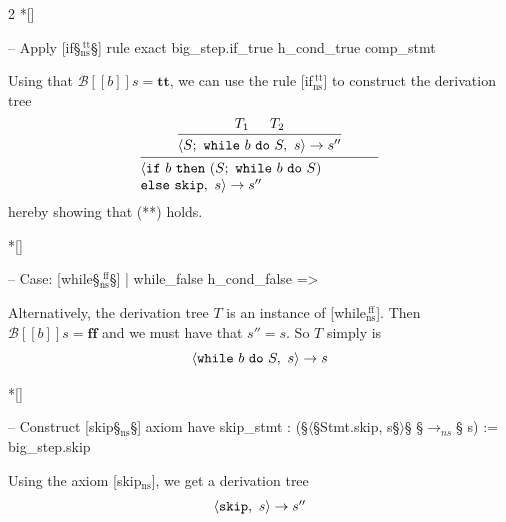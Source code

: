 \begin{paracol}{2}
\switchcolumn[1]*[]
\begin{leftcolumn}
    \begin{Lean_Code}
    -- Apply [if§\color{green!40!black}$_{\text{ns}}^{\ \text{tt}}$§] rule
    exact big_step.if_true
      h_cond_true
      comp_stmt
    \end{Lean_Code}
\end{leftcolumn}

\begin{rightcolumn} \noindent
Using that \(\mathcal{B}[\![b]\!]s = \mathbf{tt}\), we can use the rule [if$_{\text{ns}}^{\ \text{tt}}$]
to construct the derivation tree
\[
    \begin{prooftree}
        \hypo{T_1}
        \hypo{T_2}
        \infer[
            ]2{
            \langle S;\ \mathtt{while}\ b\ \mathtt{do}\ S,\ s\rangle \to s''
            }
        \infer[
            ]1{
                \parbox{6cm}{$
            \langle \mathtt{if}\ b\ \mathtt{then}\ (S;\ \mathtt{while}\ b\ \mathtt{do}\ S) \\ \mathtt{else}\ \mathtt{skip},\ s\rangle \to s''
                $}
            }
    \end{prooftree}
\]
hereby showing that (**) holds.
\end{rightcolumn}
\vspace{2em}
\switchcolumn[1]*[]
\begin{leftcolumn}
    \begin{Lean_Code}
  -- Case: [while§\color{green!40!black}$_{\text{ns}}^{\text{\ ff}}$§]
  | while_false h_cond_false =>
    \end{Lean_Code}
\end{leftcolumn}
\begin{rightcolumn} \noindent
Alternatively, the derivation tree \(T\) is an instance of [while$_{\text{ns}}^{\ \text{ff}}$].
Then \(\mathcal{B}[\![b]\!]s = \mathbf{ff}\) and we must have that \(s'' = s\). So \(T\) simply is
\[
    \begin{prooftree}
        \hypo{\langle \mathtt{while}\ b\ \mathtt{do}\ S,\ s\rangle \to s}
    \end{prooftree}
\]
\end{rightcolumn}
\vspace{1.5em}

\switchcolumn[1]*[]
\begin{leftcolumn}
    \begin{Lean_Code}
    -- Construct [skip§\color{green!40!black}$_{\text{ns}}$§] axiom
    have skip_stmt :
      (§\(\langle\)§Stmt.skip, s§\(\rangle\)§
      §\(\to_{ns}\)§ s) :=
      big_step.skip
    \end{Lean_Code}
\end{leftcolumn}
\begin{rightcolumn} \noindent
Using the axiom [skip$_{\text{ns}}$], we get a derivation tree
\[
    \begin{prooftree}
        \hypo{\langle \mathtt{skip},\ s\rangle \to s''}
    \end{prooftree}
\]
\end{rightcolumn}
\vspace{1.5em}


\end{paracol}
